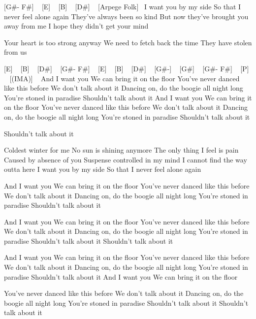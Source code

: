 

[G#- F#] ~  [E] ~ [B] ~ [D#] ~
[Arpege Folk]~
I want you by my side
So that I never feel alone again
They've always been so kind
But now they've brought you away from me
I hope they didn't get your mind

Your heart is too strong anyway
We need to fetch back the time
They have stolen from us

[E] ~ [B] ~ [D#] ~ [G#- F#] ~
[E] ~ [B] ~ [D#] ~ [G#-] ~
[G#] ~ [G#- F#] ~
[P] ~ [(IMA)] ~
And I want you
We can bring it on the floor
You've never danced like this before
We don't talk about it
Dancing on, do the boogie all night long
You're stoned in paradise
Shouldn't talk about it
And I want you
We can bring it on the floor
You've never danced like this before
We don't talk about it
Dancing on, do the boogie all night long
You're stoned in paradise
Shouldn't talk about it

Shouldn't talk about it

Coldest winter for me
No sun is shining anymore
The only thing I feel is pain
Caused by absence of you
Suspense controlled in my mind
I cannot find the way outta here
I want you by my side
So that I never feel alone again

And I want you
We can bring it on the floor
You've never danced like this before
We don't talk about it
Dancing on, do the boogie all night long
You're stoned in paradise
Shouldn't talk about it

And I want you
We can bring it on the floor
You've never danced like this before
We don't talk about it
Dancing on, do the boogie all night long
You're stoned in paradise
Shouldn't talk about it
Shouldn't talk about it

And I want you
We can bring it on the floor
You've never danced like this before
We don't talk about it
Dancing on, do the boogie all night long
You're stoned in paradise
Shouldn't talk about it
And I want you
We can bring it on the floor

You've never danced like this before
We don't talk about it
Dancing on, do the boogie all night long
You're stoned in paradise
Shouldn't talk about it
Shouldn't talk about it
